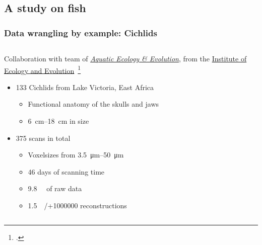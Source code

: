  \subsection{A study on fish}
 \begin{frame}
 	\frametitle{Data wrangling by example: Cichlids}
	\begin{columns}
		\begin{column}{0.618\linewidth}
		 	Collaboration with team of \href{https://www.aqua.iee.unibe.ch/}{\emph{Aquatic Ecology \& Evolution}}, from the \href{https://www.iee.unibe.ch/}{Institute of Ecology and Evolution}~\footcite{Haberthuer2023}
			\begin{itemize}
	 		 	\item 133 Cichlids from Lake Victoria, East Africa
				\begin{itemize}
					\item Functional anatomy of the skulls and jaws
					\item \qtyrange{6}{18}{\centi\meter} in size
				\end{itemize}
				\item 375 scans in total
	 			\begin{itemize}
					\item Voxelsizes from \qtyrange{3.5}{50}{\micro\meter}
	 				\item 46 days of scanning time
	 				\item \qty{9.8}{\tera\byte} of raw data
	 				\item \qty{1.5}{\tera\byte}/+\num{1000000} reconstructions
	 			\end{itemize}
	 		\end{itemize}
		\end{column}
		\begin{column}{0.382\linewidth}
			\centering
\end{column}
\end{columns}
\end{frame}
